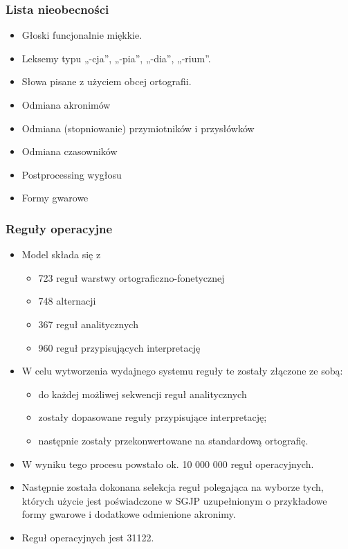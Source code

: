 \documentclass{beamer}
\begin{document}
\begin{frame}
\frametitle{Lista nieobecności}
\begin{itemize}
\item Głoski funcjonalnie miękkie.
\item Leksemy typu „-cja”, „-pia”, „-dia”, „-rium”.
\item Słowa pisane z użyciem obcej ortografii. 
\item Odmiana akronimów
\item Odmiana (stopniowanie) przymiotników i przysłówków
\item Odmiana czasowników
\item Postprocessing wygłosu
\item Formy gwarowe
\end{itemize}
\end{frame}

\begin{frame}
\frametitle{Reguły operacyjne}
\begin{itemize}
\item Model składa się z
\begin{itemize}
\item 723 reguł warstwy ortograficzno-fonetycznej
\item 748 alternacji
\item 367 reguł analitycznych
\item 960 reguł przypisujących interpretację
\end{itemize}
\item W celu wytworzenia wydajnego systemu reguły te zostały złączone ze sobą:
\begin{itemize}
\item do każdej możliwej sekwencji reguł analitycznych
\item zostały dopasowane reguły przypisujące interpretację;
\item następnie zostały przekonwertowane na standardową ortografię.
\end{itemize}
\item W wyniku tego procesu powstało ok. 10 000 000 reguł operacyjnych.
\item Następnie została dokonana selekcja reguł polegająca na wyborze tych, których użycie jest poświadczone w SGJP uzupełnionym o przykładowe formy gwarowe i dodatkowe odmienione akronimy. 
\item Reguł operacyjnych jest 31122.
\end{itemize}
\end{frame}
\end{document}
